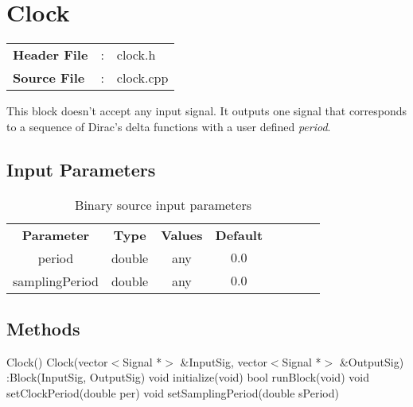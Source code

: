 \clearpage

\section{Clock}

\begin{tcolorbox}	
	\begin{tabular}{p{2.75cm} p{0.2cm} p{10.5cm}} 	
		\textbf{Header File}   &:& clock.h \\
		\textbf{Source File}   &:& clock.cpp \\
	\end{tabular}
\end{tcolorbox}

This block doesn't accept any input signal. It outputs one signal that corresponds to a sequence of Dirac's delta functions with a user defined \textit{period}.

\subsection*{Input Parameters}


\begin{table}[h]
	\centering
	\begin{tabular}{|c|c|c|c|cccc}
		\cline{1-4}
		\textbf{Parameter} & \textbf{Type} & \textbf{Values} &   \textbf{Default}& \\ \cline{1-4}
		period & double & any & $0.0$ \\ \cline{1-4}
		samplingPeriod & double & any & $0.0$ \\ \cline{1-4}
	\end{tabular}
	\caption{Binary source input parameters}
	\label{table:clock_in_par}
\end{table}

\subsection*{Methods}

Clock() {}
\bigbreak
Clock(vector$<$Signal *$>$ \&InputSig, vector$<$Signal *$>$ \&OutputSig) :Block(InputSig, OutputSig) {}
\bigbreak
void initialize(void)
\bigbreak
bool runBlock(void)
\bigbreak
void setClockPeriod(double per)
\bigbreak
void setSamplingPeriod(double sPeriod)

